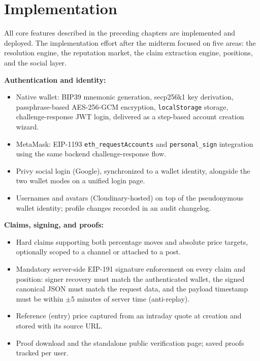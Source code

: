 \documentclass[a4paper,12pt]{report}
\begin{document}
\section{Implementation}

All core features described in the preceding chapters are implemented and deployed. The implementation effort after the midterm focused on five areas: the resolution engine, the reputation market, the claim extraction engine, positions, and the social layer.

\textbf{Authentication and identity:}
\begin{itemize}
    \item Native wallet: BIP39 mnemonic generation, secp256k1 key derivation, passphrase-based AES-256-GCM encryption, \texttt{localStorage} storage, challenge-response JWT login, delivered as a step-based account creation wizard.
    \item MetaMask: EIP-1193 \texttt{eth\_requestAccounts} and \texttt{personal\_sign} integration using the same backend challenge-response flow.
    \item Privy social login (Google), synchronized to a wallet identity, alongside the two wallet modes on a unified login page.
    \item Usernames and avatars (Cloudinary-hosted) on top of the pseudonymous wallet identity; profile changes recorded in an audit changelog.
\end{itemize}

\textbf{Claims, signing, and proofs:}
\begin{itemize}
    \item Hard claims supporting both percentage moves and absolute price targets, optionally scoped to a channel or attached to a post.
    \item Mandatory server-side EIP-191 signature enforcement on every claim and position: signer recovery must match the authenticated wallet, the signed canonical JSON must match the request data, and the payload timestamp must be within $\pm$5 minutes of server time (anti-replay).
    \item Reference (entry) price captured from an intraday quote at creation and stored with its source URL.
    \item Proof download and the standalone public verification page; saved proofs tracked per user.
\end{itemize}
\end{document}
